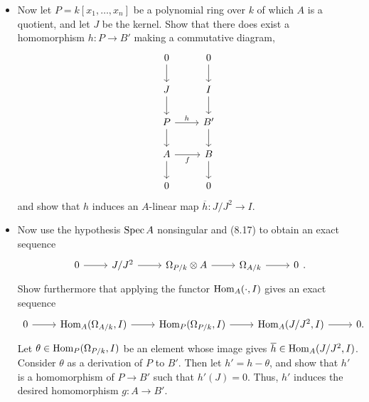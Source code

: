 \documentclass[a4paper]{article}
\begin{document}
\begin{enumerate} [label=\textbf{\arabic*.}, leftmargin=0em]
\begin{itemize}
              \item[(b)] Now let $P = k[x_1, \dots, x_n]$ be a polynomial ring over $k$ of which $A$ is a quotient, and let $J$ be the kernel. Show that there does exist a homomorphism $h : P \to B'$ making a commutative diagram,
                    \[ \begin{tikzcd}
                            0 \arrow[d]                 & 0 \arrow[d]  \\
                            J \arrow[d]                 & I \arrow[d]  \\
                            P \arrow[d] \arrow[r, "h"]  & B' \arrow[d] \\
                            A \arrow[d] \arrow[r, "f"'] & B \arrow[d]  \\
                            0                           & 0
                        \end{tikzcd} \]
                    and show that $h$ induces an $A$-linear map $\overline{h} : J / J^2 \to I$.
              \item[(c)] Now use the hypothesis $\operatorname{Spec}{A}$ nonsingular and (8.17) to obtain an exact sequence
                    \[ \begin{tikzcd}
                            0 \arrow[r] & {J/J^2} \arrow[r] & {\Omega_{P/k} \otimes A} \arrow[r] & {\Omega_{A/k}} \arrow[r] & 0
                        \end{tikzcd}. \]
                    Show furthermore that applying the functor $\operatorname{Hom}_A(\cdot, I)$ gives an exact sequence
                    \[ \begin{tikzcd}
                            0 \arrow[r] & {\Hom_A(\Omega_{A/k},I)} \arrow[r] & {\Hom_P(\Omega_{P/k},I)} \arrow[r] & {\Hom_A(J/J^2,I)} \arrow[r] & 0.
                        \end{tikzcd} \]
                    Let $\theta \in \operatorname{Hom}_P(\Omega_{P/k}, I)$ be an element whose image gives $\overline{h} \in \operatorname{Hom}_A(J/J^2, I)$. Consider $\theta$ as a derivation of $P$ to $B'$. Then let $h' = h - \theta$, and show that $h'$ is a homomorphism of $P \to B'$ such that $h'(J) = 0$. Thus, $h'$ induces the desired homomorphism $g : A \to B'$.
          \end{itemize}


\end{enumerate}
\end{document}
